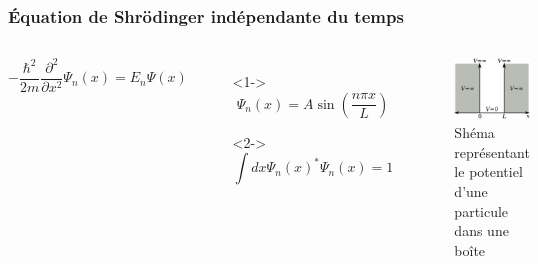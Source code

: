 \documentclass{beamer}
\begin{document}
\begin{frame}
\frametitle{Équation de Shrödinger indépendante du temps}

\begin{columns}

\begin{equation}\tag{4}
-\frac{\hbar^2}{2m}\frac{\partial^2}{\partial x^2}\Psi_n(x)=E_n\Psi(x)
\end{equation} 

\begin{itemize}
\item[]<1-> \begin{equation}\tag{5}
\Psi_n(x)=A\sin(\frac{n\pi x}{L})
\end{equation}  

\item[]<2-> \begin{equation}\tag{6}
\int dx \Psi_n(x)^* \Psi_n(x)=1
\end{equation}  
\end{itemize}
\begin{figure}
\includegraphics[scale=0.4]{Pot}
\caption{Shéma représentant le potentiel d'une particule dans une boîte}
\end{figure}
\end{columns}

\end{frame}
\end{document}
